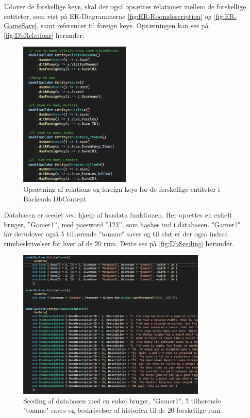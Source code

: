 \noindent Udover de forskellige keys, skal der også opsættes relationer mellem de forskellige entiteter, som vist på ER-Diagrammerne \autoref{fig:ER-Roomdescription} og \autoref{fig:ER-GameSave}, samt referencer til foreign keys. 
Opsætningen kan ses på \autoref{fig:DbRelations} herunder: 

\begin{figure}[H]
\centering
\includegraphics[width = 0.5\textwidth]{02-Body/Images/DAL-Database/DbRelations.PNG}
\caption{Opsætning af relations og foreign keys for de forskellige entiteter i Backends DbContext}
\label{fig:DbRelations}
\end{figure}

\noindent Databasen er seedet ved hjælp af hasdata funktionen. Her oprettes en enkelt bruger, ”Gamer1”, med password ”123”, som hashes ind i databasen. "Gamer1" får derudover også 5 tilhørende "tomme" saves og til slut er der også indsat rumbeskrivelser for hver af de 20 rum. Dette ses på \autoref{fig:DbSeeding} herunder.

\begin{figure}[H]
\centering
\includegraphics[width = 0.85\textwidth]{02-Body/Images/DAL-Database/DbSeeding.PNG}
\caption{Seeding af databasen med en enkel bruger, "Gamer1", 5 tilhørende "tomme" saves og beskrivelser af historien til de 20 forskellige rum}
\label{fig:DbSeeding}
\end{figure}
